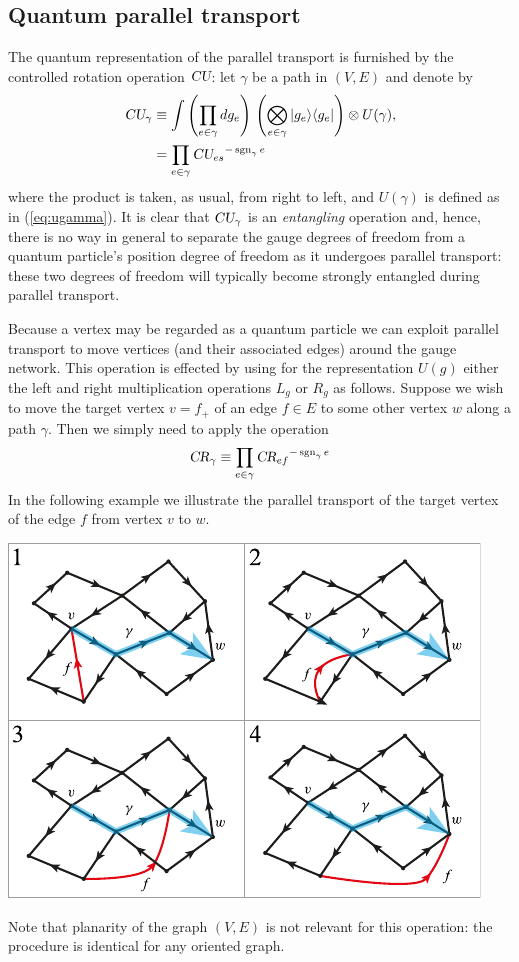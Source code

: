 \documentclass[12pt]{amsart}
\newcommand{\sgn}{\operatorname{sgn}}
\def\CR{\textsl{CR}}
\def\CU{\textsl{CU}}
\theoremstyle{definition}
\theoremstyle{remark}
\numberwithin{equation}{section}
\begin{document}
\subsection{Quantum parallel transport}
The quantum representation of the parallel transport is furnished by the controlled rotation operation $\CU$: let $\gamma$ be a path in $(V,E)$ and denote by
\begin{equation}
	\begin{split}
		\CU_\gamma &\equiv \int \left(\prod_{e\in \gamma} dg_e\right)\,  \left(\bigotimes_{e\in \gamma} |g_e\rangle\langle g_e|\right) \otimes U(\gamma), \\
		&= \prod_{e\in \gamma} {\CU_{e s}}^{-\sgn_\gamma{e}}
	\end{split}
\end{equation}
where the product is taken, as usual, from right to left, and $U(\gamma)$ is defined as in (\ref{eq:ugamma}). It is clear that $\CU_\gamma$ is an \emph{entangling} operation and, hence, there is no way in general to separate the gauge degrees of freedom from a quantum particle's position degree of freedom as it undergoes parallel transport: these two degrees of freedom will typically become strongly entangled during parallel transport.

Because a vertex may be regarded as a quantum particle we can exploit parallel transport to move vertices (and their associated edges) around the gauge network. This operation is effected by using for the representation $U(g)$ either the left and right multiplication operations $L_g$ or $R_g$ as follows. Suppose we wish to move the target vertex $v = f_+$ of an edge $f \in E$ to some other vertex $w$ along a path $\gamma$. Then we simply need to apply the operation
\begin{equation}
	\CR_\gamma \equiv \prod_{e\in \gamma} {\CR_{e f}}^{-\sgn_\gamma{e}}
\end{equation}
In the following example we illustrate the parallel transport of the target vertex of the edge $f$ from vertex $v$ to $w$.
\begin{center}
	\includegraphics{edgetx.pdf}
\end{center}
Note that planarity of the graph $(V,E)$ is not relevant for this operation: the procedure is identical for any oriented graph.
\end{document}
